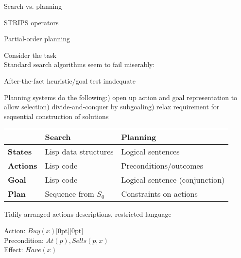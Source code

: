 \documentclass{article}
\begin{document}
\begin{huge}

\sf


\blob Search vs. planning

\blob STRIPS operators

\blob Partial-order planning



Consider the task \\
Standard search algorithms seem to fail miserably:

\vspace*{0.1in}

\textwidth
{}

After-the-fact heuristic/goal test inadequate




Planning systems do the following:) open up action and goal representation to allow selection) divide-and-conquer by subgoaling) relax requirement for sequential construction of solutions

\begin{tabular}{l|l|l}
              & {\bf Search} & {\bf Planning} \\
\hline
{\bf States}  & Lisp data structures & Logical sentences \\
{\bf Actions} & Lisp code            & Preconditions/outcomes \\
{\bf Goal}    & Lisp code            & Logical sentence (conjunction)\\
{\bf Plan}    & Sequence from $S_0$  & Constraints on actions
\end{tabular}



Tidily arranged actions descriptions, restricted language

{\sc Action}: $Buy(x)$\hfill{}\textwidth\raisebox{-1.5in}[0pt][0pt]{}\\
{\sc Precondition}: $At(p), Sells(p,x)$\\
{\sc Effect}: $Have(x)$


\end{huge}
\end{document}
